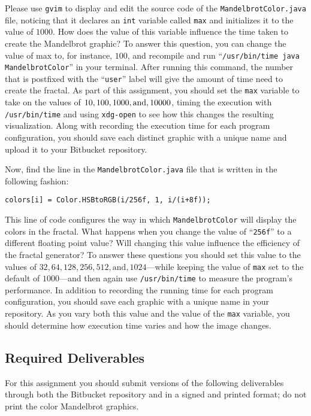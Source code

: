 Please use {\tt gvim} to display and edit the source code of the {\tt MandelbrotColor.java} file, noticing that it
declares an {\tt int} variable called {\tt max} and initializes it to the value of $1000$. How does the value of this
variable influence the time taken to create the Mandelbrot graphic? To answer this question, you can change the value of
max to, for instance, $100$, and recompile and run ``{\tt /usr/bin/time java MandelbrotColor}'' in your terminal.
After running this command, the number that is postfixed with the ``{\tt user}'' label will give the amount of time need
to create the fractal. As part of this assignment, you should set the {\tt max} variable to take on the values of $10,
100, 1000, \mbox{and}, \- 10000$, timing the execution with {\tt /usr/bin/time} and using {\tt xdg-open} to see how this
changes the resulting visualization. Along with recording the execution time for each program configuration, you should
save each distinct graphic with a unique name and upload it to your Bitbucket repository.

Now, find the line in the {\tt MandelbrotColor.java} file that is written in the following fashion:

{\tt colors[i] = Color.HSBtoRGB(i/256f, 1, i/(i+8f));}

\noindent This line of code configures the way in which {\tt MandelbrotColor} will display the colors in the fractal.
What happens when you change the value of ``{\tt 256f}'' to a different floating point value? Will changing this value
influence the efficiency of the fractal generator? To answer these questions you should set this value to the values of
$32, 64, 128, 256, 512, \mbox{and}, 1024$---while keeping the value of {\tt max} set to the default of $1000$---and then
again use {\tt /usr/bin/time} to measure the program's performance. In addition to recording the running time for each
program configuration, you should save each graphic with a unique name in your repository.  As you vary both this value
and the value of the {\tt max} variable, you should determine how execution time varies and how the image changes.

\vspace{-0.15in}
\subsection*{Required Deliverables}
\vspace{-0.05in}

For this assignment you should submit versions of the following deliverables through both the Bitbucket
repository and in a signed and printed format; do not print the color Mandelbrot graphics.

